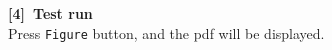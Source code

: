 \documentclass{article}
\begin{document}
\begin{enumerate}[\bf\large 1.]
\begin{enumerate}[(1)]
\vspace{77mm}

{\bf [4]\ Test run}\\
\hspace*{10mm}Press \verb|Figure| button, and the pdf will be displayed.

  \end{enumerate}

  \end{enumerate}
\end{document}
